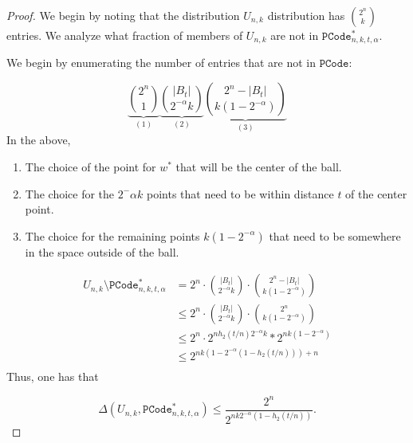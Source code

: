  \begin{proof}
 We begin by noting that the distribution $U_{n,k}$ distribution has ${2^n \choose k}$ entries.  We analyze what fraction of members of $U_{n,k}$ are not in $\mathtt{PCode}_{n, k, t, \alpha}^{*}$.
 
 We begin by enumerating the number of entries that are not in $\mathtt{PCode}$:
 
 \[
  \underbrace{{2^n \choose 1}}_{(1)}  \underbrace{{|B_t| \choose 2^{-\alpha}k}}_{(2)}   \underbrace{{2^n-|B_t| \choose k(1-2^{-\alpha})}}_{(3)}
 \]
 In the above, 
 \begin{enumerate}
 \item The choice of the point for $w^*$ that will be the center of the ball.
 \item The choice for the $2^-\alpha k$ points that need to be within distance $t$ of the center point.
 \item The choice for the remaining points $k(1-2^{-\alpha})$ that need to be somewhere in the space outside of the ball.
 \end{enumerate}
 \begin{align*}
U_{n, k} \setminus \mathtt{PCode}_{n, k, t, \alpha}^{*}  &=2^n \cdot {|B_t| \choose 2^{-\alpha}k}\cdot {2^n-|B_t| \choose k(1-2^{-\alpha})}\\
&\le 2^n \cdot {|B_t| \choose 2^{-\alpha}k}\cdot {2^n \choose k(1-2^{-\alpha})}\\
&\le 2^n \cdot 2^{nh_2(t/n) 2^{-\alpha} k} * 2^{nk(1-2^{-\alpha})}\\
&\le 2^{nk(1-2^{-\alpha}(1-h_2(t/n)))+n}\\
 \end{align*}
 Thus, one has that 
 
\[\Delta(U_{n,k}, \mathtt{PCode}_{n, k, t, \alpha}^{*}) \le \frac{2^n}{2^{nk2^{-\alpha}(1-h_2(t/n))}}.\]
 \end{proof}